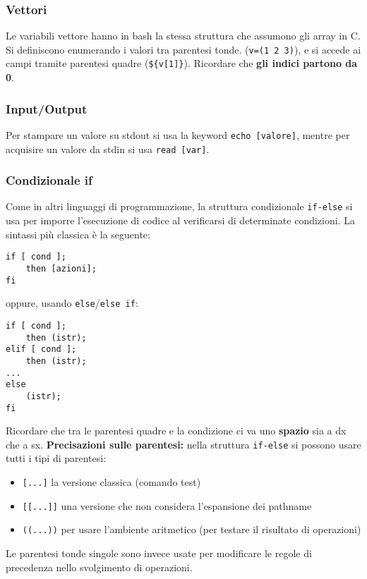 \documentclass[a4paper, 10pt]{article}
\begin{document}
\subsubsection{Vettori}
Le variabili vettore hanno in bash la stessa struttura che assumono gli array in C. Si definiscono enumerando i valori tra parentesi tonde. (\verb|v=(1 2 3)|), e si accede ai campi tramite parentesi quadre (\verb|${v[1]}|). 
Ricordare che \textbf{gli indici partono da 0}.

\subsubsection{Input/Output} Per stampare un valore su stdout si usa la keyword \verb|echo [valore]|, mentre per acquisire un valore da stdin si usa \verb|read [var]|.

\subsubsection{Condizionale if}
Come in altri linguaggi di programmazione, la struttura condizionale \verb|if-else| si usa per imporre l'esecuzione di codice al verificarsi di determinate condizioni. La sintassi più classica è la seguente:
\begin{verbatim}
if [ cond ];
    then [azioni];
fi
\end{verbatim} oppure, usando \verb|else|/\verb|else if|:
\begin{verbatim}
if [ cond ];
    then (istr);
elif [ cond ];
    then (istr);
...
else
    (istr);
fi
\end{verbatim}

Ricordare che tra le parentesi quadre e la condizione ci va uno \textbf{spazio} sia a dx che a sx.
\textbf{Precisazioni sulle parentesi:} nella struttura \verb|if-else| si possono usare tutti i tipi di parentesi:
\begin{itemize}
\item \verb|[...]| la versione classica (comando test)
\item \verb|[[...]]| una versione che non considera l'espansione dei pathname
\item \verb|((...))| per usare l'ambiente aritmetico (per testare il risultato di operazioni)
\end{itemize}
Le parentesi tonde singole sono invece usate per modificare le regole di precedenza nello svolgimento di operazioni.
\end{document}
